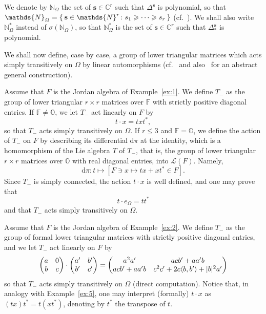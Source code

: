 \documentclass[10.5pt,reqno]{amsart}
\newcommand{\vect}[1]{\mathbf{{#1}}}
\newcommand{\dd}{\mathrm{d}}
\DeclarePairedDelimiter{\abs}{\lvert}{\rvert}
\let\originalleft\left
\let\originalright\right
\renewcommand{\left}{\mathopen{}\mathclose\bgroup\originalleft}
\renewcommand{\right}{\aftergroup\egroup\originalright}
\newcommand{\N}{\mathds{N}}
\newcommand{\C}{\mathds{C}}
\newcommand{\Od}{\mathds{O}}
\newcommand{\F}{\mathds{F}}
\newcommand{\Lc}{\mathcal{L}}
\newcommand{\meg}{\leqslant}
\newcommand{\Meg}{\geqslant}
\begin{document}
\begin{deff}
	We denote by $\N_\Omega$ the set of $\vect s\in \C^r$ such that $\Delta^{\vect s}$ is polynomial, so that $\N_\Omega=\Set{\vect s\in \N^r\colon s_1\Meg \cdots \Meg s_r}$ (cf.~\cite[Proposition XI.2.1]{FarautKoranyi}). We shall also write $\N^*_\Omega$ instead of $\sigma(\N_\Omega)$, so that $\N^*_\Omega$ is the set of $\vect s\in \C^r$ such that $\Delta_*^{\vect s}$ is polynomial.
\end{deff}
We shall now define, case by case, a group of lower triangular matrices which acts simply transitively on $\Omega$ by linear automorphisms    (cf.~\cite[Proposition VI.3.8]{FarautKoranyi} and also~\cite{Vinberg} for an abstract general construction).

\begin{ex}\label{ex:5}
	Assume that $F$ is the Jordan algebra of Example~\ref{ex:1}. We define $T_-$ as the group of lower triangular $r\times r$ matrices over $\F$ with strictly positive diagonal entries. If $\F\neq \Od$, we let $T_-$ act linearly on $F$  by
	\[
	t\cdot x=t x t^*,
	\]
	so that $T_-$ acts simply transitively on $\Omega$. If $r\meg 3$ and $\F=\Od$, we define the action of $T_-$ on $F$ by describing its differential $\dd\pi$ at the identity, which is a homomorphism of the Lie algebra $T$ of $T_-$, that is, the group of lower triangular $r\times r$ matrices over $\Od$ with real diagonal entries, into $\Lc(F)$. Namely,
	\[
	\dd \pi\colon t\mapsto [F\ni x\mapsto t x+ x t^*\in F].
	\]
	Since $T_-$ is simply connected, the action $t\cdot x$ is well defined, and one may prove that
	\[
	t\cdot e_\Omega= t t^*
	\]
	and that $T_-$ acts simply transitively on $\Omega$.
\end{ex}

\begin{ex}\label{ex:6}
	Assume that $F$ is the Jordan algebra of Example~\ref{ex:2}. We define $T_-$ as the group of formal lower triangular matrices with strictly positive diagonal entries, and we let $T_-$ act linearly on $F$ by
	\[
	\left(\begin{matrix}	a & 0\\ b & c	\end{matrix}\right)\cdot 
	\left(\begin{matrix}	a' & b'\\ b' & c'	\end{matrix}\right)=
	\left(\begin{matrix}	a^2 a' & a c b'+a a' b\\ a c b'+a a' b & c^2 c'+2 c \langle b,b'\rangle+\abs{b}^2 a'	\end{matrix}\right)
	\]
	so that $T_-$ acts simply transitively on $\Omega$ (direct computation). Notice that, in analogy with Example~\ref{ex:5}, one may interpret (formally) $t\cdot x$ as $(t x)t^*=t(x t^*)$, denoting by $t^*$ the transpose of $t$.
\end{ex}
\end{document}
